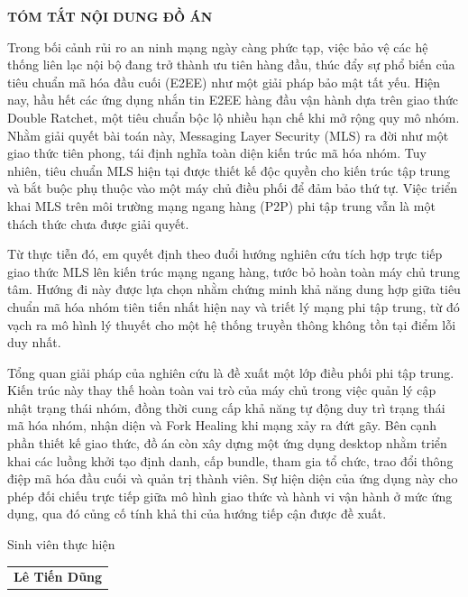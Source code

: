 \documentclass[../DoAn.tex]{subfiles}
\begin{document}
\begin{center}
    \Large{\textbf{TÓM TẮT NỘI DUNG ĐỒ ÁN}}\\
\end{center}
\vspace{1cm}
Trong bối cảnh rủi ro an ninh mạng ngày càng phức tạp, việc bảo vệ các hệ thống liên lạc nội bộ đang trở thành ưu tiên hàng đầu, thúc đẩy sự phổ biến của tiêu chuẩn mã hóa đầu cuối (E2EE) như một giải pháp bảo mật tất yếu. Hiện nay, hầu hết các ứng dụng nhắn tin E2EE hàng đầu vận hành dựa trên giao thức Double Ratchet, một tiêu chuẩn bộc lộ nhiều hạn chế khi mở rộng quy mô nhóm. Nhằm giải quyết bài toán này, Messaging Layer Security (MLS) ra đời như một giao thức tiên phong, tái định nghĩa toàn diện kiến trúc mã hóa nhóm. Tuy nhiên, tiêu chuẩn MLS hiện tại được thiết kế độc quyền cho kiến trúc tập trung và bắt buộc phụ thuộc vào một máy chủ điều phối để đảm bảo thứ tự. Việc triển khai MLS trên môi trường mạng ngang hàng (P2P) phi tập trung vẫn là một thách thức chưa được giải quyết. 

Từ thực tiễn đó, em quyết định theo đuổi hướng nghiên cứu tích hợp trực tiếp giao thức MLS lên kiến trúc mạng ngang hàng, tước bỏ hoàn toàn máy chủ trung tâm. Hướng đi này được lựa chọn nhằm chứng minh khả năng dung hợp giữa tiêu chuẩn mã hóa nhóm tiên tiến nhất hiện nay và triết lý mạng phi tập trung, từ đó vạch ra mô hình lý thuyết cho một hệ thống truyền thông không tồn tại điểm lỗi duy nhất. 

Tổng quan giải pháp của nghiên cứu là đề xuất một lớp điều phối phi tập trung. Kiến trúc này thay thế hoàn toàn vai trò của máy chủ trong việc quản lý cập nhật trạng thái nhóm, đồng thời cung cấp khả năng tự động duy trì trạng thái mã hóa nhóm, nhận diện và Fork Healing khi mạng xảy ra đứt gãy. Bên cạnh phần thiết kế giao thức, đồ án còn xây dựng một ứng dụng desktop nhằm triển khai các luồng khởi tạo định danh, cấp bundle, tham gia tổ chức, trao đổi thông điệp mã hóa đầu cuối và quản trị thành viên. Sự hiện diện của ứng dụng này cho phép đối chiếu trực tiếp giữa mô hình giao thức và hành vi vận hành ở mức ứng dụng, qua đó củng cố tính khả thi của hướng tiếp cận được đề xuất.

\begin{flushright}
Sinh viên thực hiện\\
\vspace{1.5cm}
\begin{tabular}{@{}c@{}}
\textbf{Lê Tiến Dũng}
\end{tabular}
\end{flushright}
\end{document}
